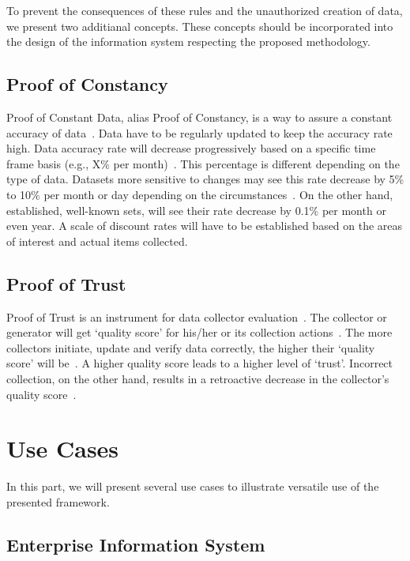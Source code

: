 To prevent the consequences of these rules and the unauthorized creation of data, we present two additianal concepts.
These concepts should be incorporated into the design of the information system respecting the proposed methodology.

\subsection{Proof of Constancy}

Proof of Constant Data, alias Proof of Constancy, is a way to assure a constant accuracy of data~\cite{dataeum}.
Data have to be regularly updated to keep the accuracy rate high.
Data accuracy rate will decrease progressively based on a specific time frame basis (e.g., X\% per month)~\cite{dataeum}.
This percentage is different depending on the type of data.
Datasets more sensitive to changes may see this rate decrease by 5\% to 10\% per month or day depending on the circumstances~\cite{dataeum}.
On the other hand, established, well-known sets, will see their rate decrease by 0.1\% per month or even year.
A scale of discount rates will have to be established based on the areas of interest and actual items collected.

\subsection{Proof of Trust}

Proof of Trust is an instrument for data collector evaluation~\cite{dataeum}.
The collector or generator will get \enquote*{quality score} for his/her or its collection actions~\cite{dataeum}.
The more collectors initiate, update and verify data correctly, the higher their \enquote*{quality score} will be~\cite{dataeum}.
A higher quality score leads to a higher level of \enquote*{trust}.
Incorrect collection, on the other hand, results in a retroactive decrease in the collector's quality score~\cite{dataeum}.

\section{Use Cases}

In this part, we will present several use cases to illustrate versatile use of the presented framework.

\subsection{Enterprise Information System}

